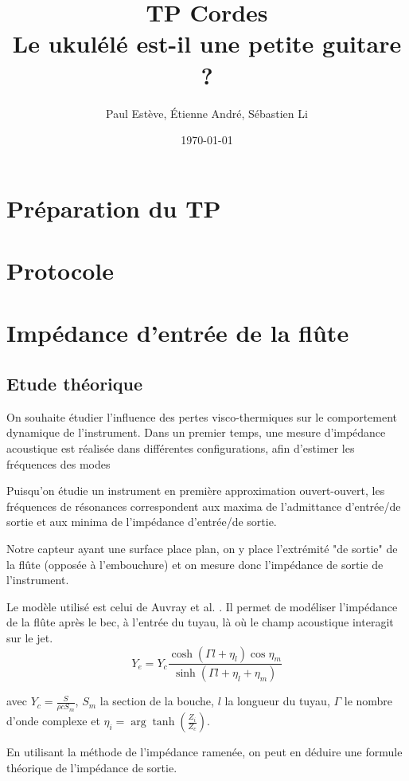 \documentclass[atiam, article]{rapport} %
\title{TP Cordes\\Le ukulélé est-il une petite guitare ?}
\author{Paul Estève, Étienne André, Sébastien Li} %
\date{\today}
\begin{document}
\maketitle


\section{Préparation du TP}


\section{Protocole}

\section{Impédance d'entrée de la flûte}

\subsection{Etude théorique}

On souhaite étudier l'influence des pertes visco-thermiques sur le comportement dynamique de l'instrument. Dans un premier temps, une mesure d'impédance acoustique est réalisée dans différentes configurations, afin d'estimer les fréquences des modes 

Puisqu'on étudie un instrument en première approximation ouvert-ouvert, les fréquences de résonances correspondent aux maxima de l'admittance d'entrée/de sortie et aux minima de l'impédance d'entrée/de sortie.

Notre capteur ayant une surface place plan, on y place l'extrémité "de sortie" de la flûte (opposée à l'embouchure) et on mesure donc l'impédance de sortie de l'instrument.

Le modèle utilisé est celui de Auvray et al. \cite{Auvray2011}. Il permet de modéliser l'impédance de la flûte après le bec, à l'entrée du tuyau, là où le champ acoustique interagit sur le jet.
$$Y_e=Y_c \frac{\cosh \left(\Gamma l+\eta_l\right) \cos \eta_m}{\sinh \left(\Gamma l+\eta_l+\eta_m\right)}$$

avec $Y_c = \frac{S}{\rho c S_m}$, $S_m$ la section de la bouche, $l$ la longueur du tuyau, $\Gamma$ le nombre d'onde complexe et $\eta_i = \arg \tanh\left(\frac{Z_i}{Z_c}\right)$.

En utilisant la méthode de l'impédance ramenée, on peut en déduire une formule théorique de l'impédance de sortie.
\end{document}
